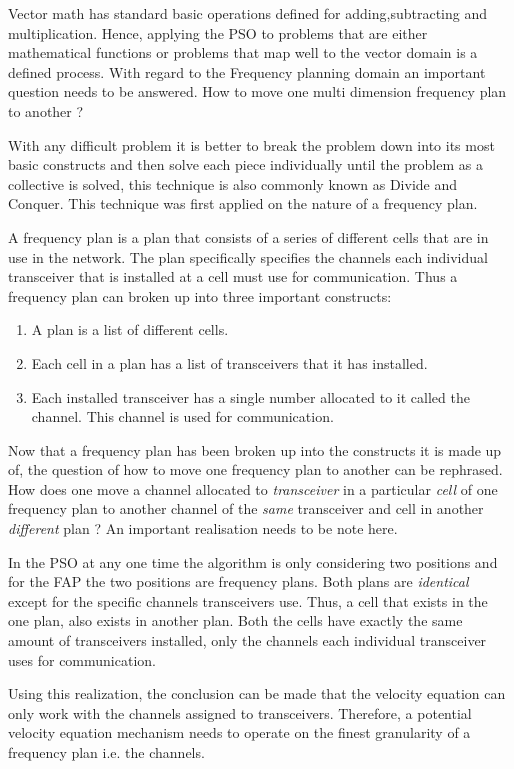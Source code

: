 Vector math has standard basic operations defined for adding,subtracting and multiplication. Hence, applying the PSO to problems that are either mathematical functions or problems that map well to the vector domain is a defined process. With regard to the Frequency planning domain an important question needs to be answered. How to move one multi dimension frequency plan to another ?

With any difficult problem it is better to break the problem down into its most basic constructs and then solve each piece individually until the problem as a collective is solved, this technique is also commonly known as Divide and Conquer. This technique was first applied on the nature of a frequency plan.

A frequency plan is a plan that consists of a series of different cells that are in use in the network. The plan specifically specifies the channels each individual transceiver that is installed at a cell must use for communication. Thus a frequency plan can broken up into three important constructs:
\begin{enumerate}
\item A plan is a list of different cells.
\item Each cell in a plan has a list of transceivers that it has installed.
\item Each installed transceiver has a single number allocated to it called the channel. This channel is used for communication.
\end{enumerate}

Now that a frequency plan has been broken up into the constructs it is made up of, the question of how to move one frequency plan to another can be rephrased. How does one move a channel allocated to \emph{transceiver} in a particular \emph{cell} of one frequency plan to another channel of the \emph{same} transceiver and cell in another \emph{different} plan ? An important realisation needs to be note here.

In the PSO at any one time the algorithm is only considering two positions and for the FAP the two positions are frequency plans. Both plans are \emph{identical} except for the specific channels transceivers use. Thus, a cell that exists in the one plan, also exists in another plan. Both the cells have exactly the same amount of transceivers installed, only the channels each individual transceiver uses for communication.

Using this realization, the conclusion can be made that the velocity equation can only work with the channels assigned to transceivers. Therefore, a potential velocity equation mechanism needs to operate on the finest granularity of a frequency plan i.e. the channels.


